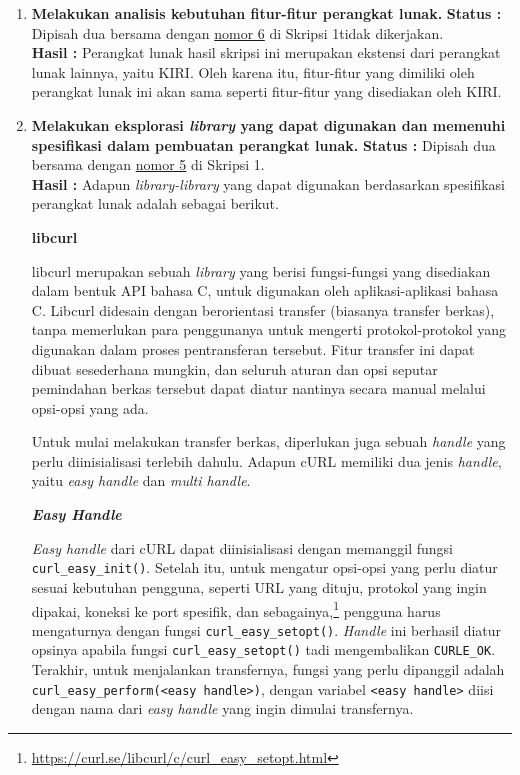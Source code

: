 \documentclass[a4paper,twoside]{article}
\begin{document}
\begin{enumerate}
\begin{itemize}
\end{itemize}
		
		\item \textbf{Melakukan analisis kebutuhan fitur-fitur perangkat lunak.}		
		\label{sec:num5} \newline
		{\bf Status :} Dipisah dua bersama dengan \hyperref[sec:num6]{nomor 6} di Skripsi 1\textemdash tidak dikerjakan.\\
		{\bf Hasil :} Perangkat lunak hasil skripsi ini merupakan ekstensi dari perangkat lunak lainnya, yaitu KIRI. Oleh karena itu, fitur-fitur yang dimiliki oleh perangkat lunak ini akan sama seperti fitur-fitur yang disediakan oleh KIRI.
		
		
		\item \textbf{Melakukan eksplorasi \textit{library} yang dapat digunakan dan memenuhi spesifikasi dalam pembuatan perangkat lunak.}
		\label{sec:num6} \newline
		{\bf Status :} Dipisah dua bersama dengan \hyperref[sec:num5]{nomor 5} di Skripsi 1.\\
		{\bf Hasil :} Adapun \textit{library-library} yang dapat digunakan berdasarkan spesifikasi perangkat lunak adalah sebagai berikut.
		
\textbf{libcurl \cite{stenberg:2022:everythingcurl}}

libcurl merupakan sebuah \textit{library} yang berisi fungsi-fungsi yang disediakan dalam bentuk API bahasa C, untuk digunakan oleh aplikasi-aplikasi bahasa C. Libcurl didesain dengan berorientasi transfer (biasanya transfer berkas), tanpa memerlukan para penggunanya untuk mengerti protokol-protokol yang digunakan dalam proses pentransferan tersebut. Fitur transfer ini dapat dibuat sesederhana mungkin, dan seluruh aturan dan opsi seputar pemindahan berkas tersebut dapat diatur nantinya secara manual melalui opsi-opsi yang ada.

Untuk mulai melakukan transfer berkas, diperlukan juga sebuah \textit{handle} yang perlu diinisialisasi terlebih dahulu. Adapun cURL memiliki dua jenis \textit{handle}, yaitu \textit{easy handle} dan \textit{multi handle}. 

\textbf{\textit{Easy Handle}}

\textit{Easy handle} dari cURL dapat diinisialisasi dengan memanggil fungsi \verb|curl_easy_init()|. Setelah itu, untuk mengatur opsi-opsi yang perlu diatur sesuai kebutuhan pengguna, seperti URL yang dituju, protokol yang ingin dipakai, koneksi ke port spesifik, dan sebagainya,\footnote{\href{https://curl.se/libcurl/c/curl\_easy\_setopt.html}{https://curl.se/libcurl/c/curl\_easy\_setopt.html}} pengguna harus mengaturnya dengan fungsi \verb|curl_easy_setopt()|. \textit{Handle} ini berhasil diatur opsinya apabila fungsi \verb|curl_easy_setopt()| tadi mengembalikan \verb|CURLE_OK|. Terakhir, untuk menjalankan transfernya, fungsi yang perlu dipanggil adalah \verb|curl_easy_perform(<easy handle>)|, dengan variabel \verb|<easy handle>| diisi dengan nama dari \textit{easy handle} yang ingin dimulai transfernya.


\end{enumerate}
\end{document}
